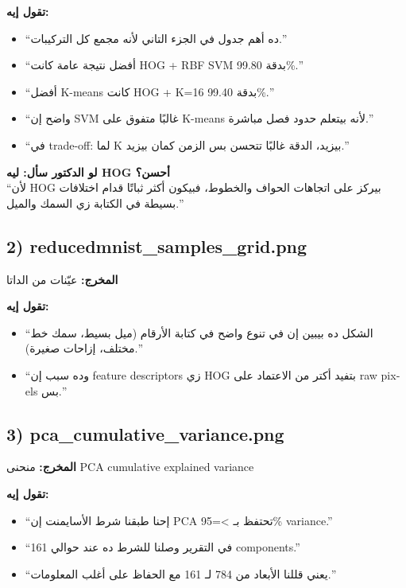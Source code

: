 \documentclass[12pt,a4paper]{article}
\begin{document}
\textbf{تقول إيه:}
\begin{itemize}[leftmargin=1.5em]
    \item ``ده أهم جدول في الجزء التاني لأنه مجمع كل التركيبات.''
    \item ``أفضل نتيجة عامة كانت \textenglish{HOG + RBF SVM} بدقة \textenglish{99.80\%}.''
    \item ``أفضل \textenglish{K-means} كانت \textenglish{HOG + K=16} بدقة \textenglish{99.40\%}.''
    \item ``واضح إن \textenglish{SVM} غالبًا متفوق على \textenglish{K-means} لأنه بيتعلم حدود فصل مباشرة.''
    \item ``في \textenglish{trade-off}: لما \textenglish{K} بيزيد، الدقة غالبًا تتحسن بس الزمن كمان بيزيد.''
\end{itemize}

\textbf{لو الدكتور سأل: ليه \textenglish{HOG} أحسن؟}\\
``لأن \textenglish{HOG} بيركز على اتجاهات الحواف والخطوط، فبيكون أكثر ثباتًا قدام اختلافات بسيطة في الكتابة زي السمك والميل.''

\subsection*{2) \textenglish{reducedmnist\_samples\_grid.png}}
\textbf{المخرج:} عيّنات من الداتا

\textbf{تقول إيه:}
\begin{itemize}[leftmargin=1.5em]
    \item ``الشكل ده بيبين إن في تنوع واضح في كتابة الأرقام (ميل بسيط، سمك خط مختلف، إزاحات صغيرة).''
    \item ``وده سبب إن \textenglish{feature descriptors} زي \textenglish{HOG} بتفيد أكتر من الاعتماد على \textenglish{raw pixels} بس.''
\end{itemize}

\subsection*{3) \textenglish{pca\_cumulative\_variance.png}}
\textbf{المخرج:} منحنى \textenglish{PCA cumulative explained variance}

\textbf{تقول إيه:}
\begin{itemize}[leftmargin=1.5em]
    \item ``إحنا طبقنا شرط الأسايمنت إن \textenglish{PCA} تحتفظ بـ \textenglish{>=95\% variance}.''
    \item ``في التقرير وصلنا للشرط ده عند حوالي \textenglish{161 components}.''
    \item ``يعني قللنا الأبعاد من \textenglish{784} لـ \textenglish{161} مع الحفاظ على أغلب المعلومات.''
\end{itemize}
\end{document}
